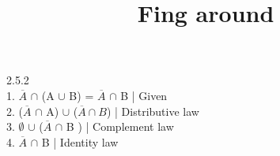 \documentclass{article}
\title{Fing around}
\author{}
\date{}
\begin{document}
	\normalsize
	2.5.2 
	\\ 1. $\overline{A}$ $\cap$ (A $\cup$ B) = $\overline{A}$ $\cap$ B | Given
	\\ 2. ($\overline{A}$ $\cap$ A) $\cup$ ($\overline{A} \cap B$) | Distributive law
	\\ 3. $\emptyset$ $\cup$ ($\overline{A}$ $\cap$ B ) | Complement law
	\\ 4. $\overline{A}$ $\cap$ B | Identity law
\end{document}
